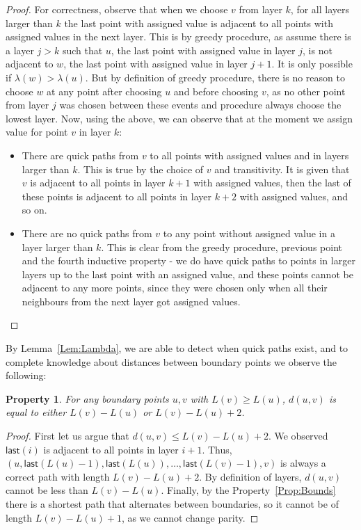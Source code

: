 \documentclass[a4paper,11pt]{article}
\newcommand{\lam}{\lambda}
\newcommand{\last}{\mathsf{last}}
\newtheorem{property}[theorem]{Property}
\begin{document}
\begin{proof}
For correctness, observe that when we choose $v$ from layer $k$,
for all layers larger than $k$ the last point with assigned value is adjacent to all points
with assigned values in the next layer.
This is by greedy procedure, as assume there is a layer $j>k$ such that $u$, the last point with assigned value in layer $j$,
is not adjacent to $w$, the last point with assigned value in layer $j+1$.
It is only possible if $\lam(w)>\lam(u)$.
But by definition of greedy procedure, there is no reason to choose $w$ at any point after choosing $u$
and before choosing $v$, as no other point from layer $j$ was chosen between these events and procedure always choose
the lowest layer.
Now, using the above, we can observe that at the moment we assign value for point $v$ in layer $k$:
\begin{itemize}
\item There are quick paths from $v$ to all points with assigned values and in layers larger than $k$.
This is true by the choice of $v$ and transitivity. It is given that $v$ is adjacent to all points in layer $k+1$
with assigned values, then the last of these points is adjacent to all points in layer $k+2$ with assigned values, and so on.
\item There are no quick paths from $v$ to any point without assigned value in a layer larger than $k$.
This is clear from the greedy procedure, previous point and the fourth inductive property -
we do have quick paths to points in larger layers up to the last point with an assigned value, and these points cannot be
adjacent to any more points, since they were chosen only when all their neighbours from the next layer got assigned values. 
\qedhere
\end{itemize}
\end{proof}


By Lemma~\ref{Lem:Lambda}, we are able to detect when quick paths exist, and to complete knowledge about distances between boundary points we observe the following:
\begin{property}
For any boundary points $u,v$ with $L(v) \geq L(u)$, $d(u,v)$ is equal to either $L(v)-L(u)$ or $L(v)-L(u)+2$.
\label{Prop:Diff2}
\end{property}
\begin{proof}
First let us argue that $d(u,v) \leq L(v)-L(u)+2$.
We observed $\last(i)$ is adjacent to all points in layer $i+1$.
Thus, $(u,\last(L(u)-1),\last(L(u)),\ldots,\last(L(v)-1),v)$ is always a correct path with length $L(v)-L(u)+2$.
By definition of layers, $d(u,v)$ cannot be less than $L(v)-L(u)$.
Finally, by the Property~\ref{Prop:Bounds} there is a shortest path that alternates between boundaries,
so it cannot be of length $L(v)-L(u)+1$, as we cannot change parity.
\end{proof}
\end{document}
